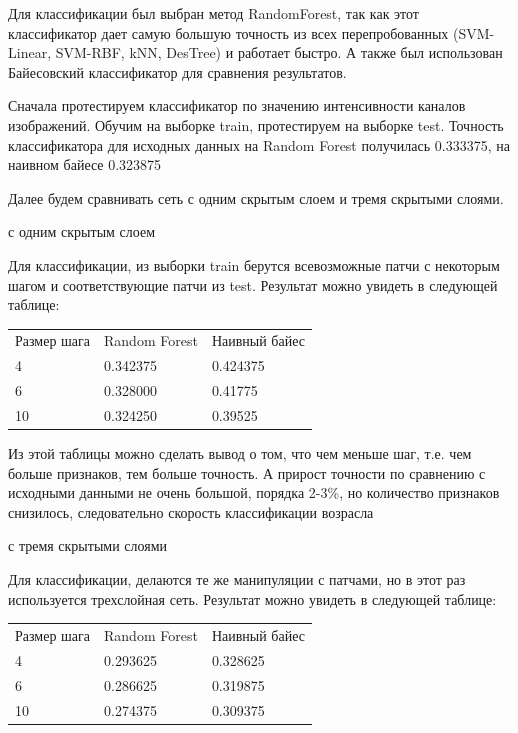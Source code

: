 \documentclass[12pt, a4paper]{article}
\begin{document}
			Для классификации был выбран метод RandomForest, так как этот классификатор дает самую большую точность из всех перепробованных (SVM-Linear, SVM-RBF, kNN, DesTree) и работает быстро. А также был использован Байесовский классификатор для сравнения результатов.

			Сначала протестируем классификатор по значению интенсивности каналов изображений. Обучим на выборке train, протестируем на выборке test. Точность классификатора для исходных данных на Random Forest получилась 0.333375, на наивном байесе 0.323875

			Далее будем сравнивать сеть с одним скрытым слоем и тремя скрытыми слоями.

			\begin{center}{ с одним скрытым слоем}\end{center}

			Для классификации, из выборки train берутся всевозможные патчи с некоторым шагом и соответствующие патчи из test. Результат можно увидеть в следующей таблице:

			\begin{center}
			\begin{tabular}{l l l}
				Размер шага & Random Forest & Наивный байес \\
				4 & 0.342375 & 0.424375\\
				6 & 0.328000 & 0.41775\\
				10 & 0.324250 & 0.39525\\
			\end{tabular}
			\end{center}

			Из этой таблицы можно сделать вывод о том, что чем меньше шаг, т.е. чем больше признаков, тем больше точность. А прирост точности по сравнению с исходными данными не очень большой, порядка 2-3\%, но количество признаков снизилось, следовательно скорость классификации возрасла

			\begin{center}{ с тремя скрытыми слоями}\end{center}

			Для классификации, делаются те же манипуляции с патчами, но в этот раз используется трехслойная сеть. Результат можно увидеть в следующей таблице:

			\begin{center}
			\begin{tabular}{l l l}
				Размер шага & Random Forest & Наивный байес \\
				4 & 0.293625 & 0.328625\\
				6 & 0.286625 & 0.319875\\
				10 & 0.274375 & 0.309375\\
			\end{tabular}
			\end{center}
\end{document}
